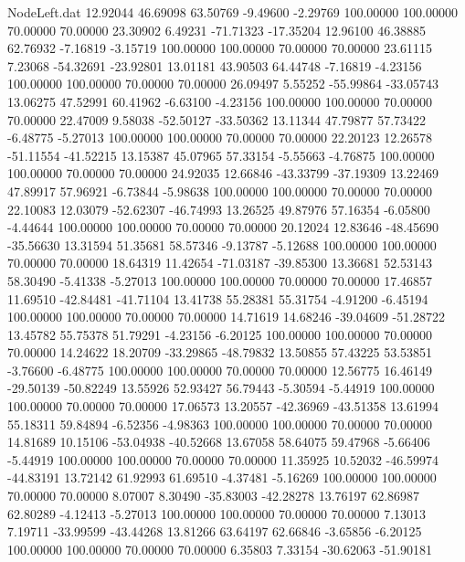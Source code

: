 \begin{filecontents}{NodeLeft.dat}
  12.92044   46.69098   63.50769    -9.49600   -2.29769  100.00000  100.00000   70.00000   70.00000   23.30902    6.49231  -71.71323  -17.35204
  12.96100   46.38885   62.76932    -7.16819   -3.15719  100.00000  100.00000   70.00000   70.00000   23.61115    7.23068  -54.32691  -23.92801
  13.01181   43.90503   64.44748    -7.16819   -4.23156  100.00000  100.00000   70.00000   70.00000   26.09497    5.55252  -55.99864  -33.05743
  13.06275   47.52991   60.41962    -6.63100   -4.23156  100.00000  100.00000   70.00000   70.00000   22.47009    9.58038  -52.50127  -33.50362
  13.11344   47.79877   57.73422    -6.48775   -5.27013  100.00000  100.00000   70.00000   70.00000   22.20123   12.26578  -51.11554  -41.52215
  13.15387   45.07965   57.33154    -5.55663   -4.76875  100.00000  100.00000   70.00000   70.00000   24.92035   12.66846  -43.33799  -37.19309
  13.22469   47.89917   57.96921    -6.73844   -5.98638  100.00000  100.00000   70.00000   70.00000   22.10083   12.03079  -52.62307  -46.74993
  13.26525   49.87976   57.16354    -6.05800   -4.44644  100.00000  100.00000   70.00000   70.00000   20.12024   12.83646  -48.45690  -35.56630
  13.31594   51.35681   58.57346    -9.13787   -5.12688  100.00000  100.00000   70.00000   70.00000   18.64319   11.42654  -71.03187  -39.85300
  13.36681   52.53143   58.30490    -5.41338   -5.27013  100.00000  100.00000   70.00000   70.00000   17.46857   11.69510  -42.84481  -41.71104
  13.41738   55.28381   55.31754    -4.91200   -6.45194  100.00000  100.00000   70.00000   70.00000   14.71619   14.68246  -39.04609  -51.28722
  13.45782   55.75378   51.79291    -4.23156   -6.20125  100.00000  100.00000   70.00000   70.00000   14.24622   18.20709  -33.29865  -48.79832
  13.50855   57.43225   53.53851    -3.76600   -6.48775  100.00000  100.00000   70.00000   70.00000   12.56775   16.46149  -29.50139  -50.82249
  13.55926   52.93427   56.79443    -5.30594   -5.44919  100.00000  100.00000   70.00000   70.00000   17.06573   13.20557  -42.36969  -43.51358
  13.61994   55.18311   59.84894    -6.52356   -4.98363  100.00000  100.00000   70.00000   70.00000   14.81689   10.15106  -53.04938  -40.52668
  13.67058   58.64075   59.47968    -5.66406   -5.44919  100.00000  100.00000   70.00000   70.00000   11.35925   10.52032  -46.59974  -44.83191
  13.72142   61.92993   61.69510    -4.37481   -5.16269  100.00000  100.00000   70.00000   70.00000    8.07007    8.30490  -35.83003  -42.28278
  13.76197   62.86987   62.80289    -4.12413   -5.27013  100.00000  100.00000   70.00000   70.00000    7.13013    7.19711  -33.99599  -43.44268
  13.81266   63.64197   62.66846    -3.65856   -6.20125  100.00000  100.00000   70.00000   70.00000    6.35803    7.33154  -30.62063  -51.90181

\end{filecontents}
